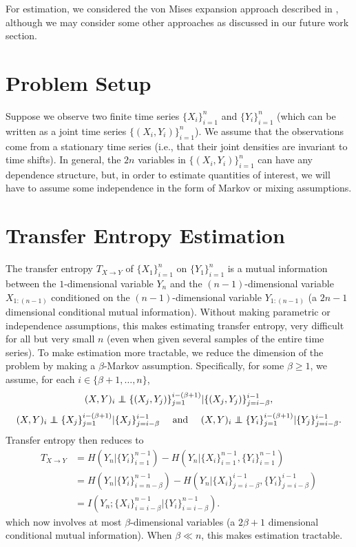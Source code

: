\documentclass{article} %
\newcommand\ind{\protect\mathpalette{\protect\independenT}{\perp}}
\def\independenT#1#2{\mathrel{\rlap{$#1#2$}\mkern2mu{#1#2}}}
\begin{document}
For estimation, we considered the von Mises expansion approach described in
\cite{kandasamy2014influence}, although we may consider some other approaches
as discussed in our future work section.

\section{Problem Setup}
Suppose we observe two finite time series $\{X_i\}_{i = 1}^n$ and
$\{Y_i\}_{i = 1}^n$ (which can be written as a joint time series
$\{(X_i,Y_i)\}_{i = 1}^n$). We assume that the observations come from a
stationary time series (i.e., that their joint densities are invariant to time
shifts). In general, the $2n$ variables in $\{(X_i,Y_i)\}_{i = 1}^n$ can have
any dependence structure, but, in order to estimate quantities of interest, we
will have to assume some independence in the form of Markov or mixing
assumptions.

\section{Transfer Entropy Estimation}
The transfer entropy $T_{X \to Y}$ of $\{X_1\}_{i = 1}^n$ on
$\{Y_1\}_{i = 1}^n$ is a mutual information between the $1$-dimensional
variable $Y_n$ and the $(n - 1)$-dimensional variable $X_{1:(n - 1)}$
conditioned on the $(n - 1)$-dimensional variable $Y_{1:(n - 1)}$ (a $2n - 1$
dimensional conditional mutual information). Without making parametric or
independence assumptions, this makes estimating transfer entropy, very
difficult for all but very small $n$ (even when given several samples of the
entire time series). To make estimation more tractable, we reduce the dimension
of the problem by making a $\beta$-Markov assumption. Specifically, for some
$\beta \geq 1$, we assume, for each $i \in \{\beta + 1,\dots,n\}$,
\begin{equation}
(X,Y)_i \ind \{(X_j,Y_j)\}_{j = 1}^{i - (\beta + 1)}
                                    | \{(X_j,Y_j)\}_{j = i - \beta}^{i - 1},
\label{joint_markov}
\end{equation}
\begin{equation}
(X,Y)_i \ind \{X_j\}_{j = 1}^{i - (\beta + 1)}
                                            | \{X_j\}_{j = i - \beta}^{i - 1}
    \quad \mbox{ and } \quad
(X,Y)_i \ind \{Y_i\}_{j = 1}^{i - (\beta + 1)}
                                        | \{Y_j\}_{j = i - \beta}^{i - 1}.
\label{marginal_markov}
\end{equation}
Transfer entropy then reduces to
\begin{align*}
T_{X \to Y}
 &  = H(Y_n | \{Y_i\}_{i = 1}^{n - 1})
        - H(Y_n | \{X_i\}_{i = 1}^{n - 1}, \{Y_i\}_{i = 1}^{n - 1}) \\
 &  = H(Y_n | \{Y_i\}_{i = n - \beta}^{n - 1})
        - H(Y_n | \{X_i\}_{j = i - \beta}^{i - 1}, \{Y_i\}_{j = i - \beta}^{i - 1}) \\
 &  = I(Y_n; \{X_i\}_{i = i - \beta}^{n - 1}
                                            | \{Y_i\}_{i = i - \beta}^{n - 1}).
\end{align*}
which now involves at most $\beta$-dimensional variables (a $2\beta + 1$
dimensional conditional mutual information). When $\beta \ll n$, this makes
estimation tractable.
\end{document}
